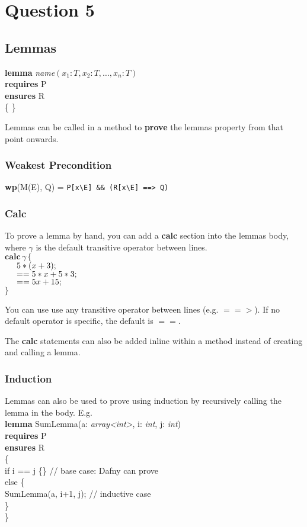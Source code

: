 \section{Question 5}

\subsection{Lemmas}
\textbf{lemma} \textit{name}$(x_1: \textit{T}, x_2: \textit{T}, \ldots, x_n: \textit{T})$ \\
        \tab \textbf{requires} P \\
        \tab \textbf{ensures} R \\
\{ \}

Lemmas can be called in a method to \textbf{prove} the lemmas property from that point onwards.

\subsubsection{Weakest Precondition}
\textbf{wp}(M(E), Q)  =  \verb!P[x\E] && (R[x\E] ==> Q)!

\subsubsection{Calc}
To prove a lemma by hand, you can add a \textbf{calc} section into the lemmas body, where \textit{$\gamma$} is the default transitive operator between lines. \\
$\textbf{calc} \, \textit{$\gamma$} \, \{$ \\
$\hspace*{0.5cm}    5*(x + 3);$ \\
$\hspace*{0.5cm} == 5*x + 5*3;$ \\
$\hspace*{0.5cm} == 5x + 15;$ \\
$\}$

You can use use any transitive operator between lines (e.g. $==>$). If no default operator is specific, the default is $==$.

The \textbf{calc} statements can also be added inline within a method instead of creating and calling a lemma.

\subsubsection{Induction}
Lemmas can also be used to prove using induction by recursively calling the lemma in the body. E.g. \\
\textbf{lemma} SumLemma(a: \textit{array<int>}, i: \textit{int}, j: \textit{int}) \\
        \tab \textbf{requires} P \\
        \tab \textbf{ensures} R \\
\{ \\
        \tab if i == j \{\} // base case: Dafny can prove\\
        \tab else \{\\
        \tab    \tab SumLemma(a, i+1, j); // inductive case\\
        \tab \}\\
\}

